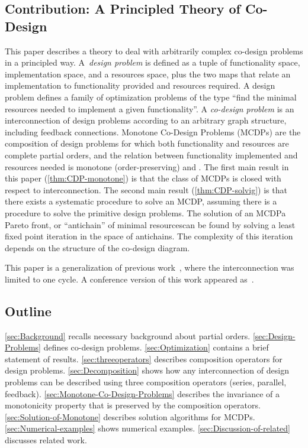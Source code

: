 \subsection{Contribution: A Principled Theory of Co-Design}

This paper describes a theory to deal with arbitrarily complex co-design
problems in a principled way. A~\emph{design problem} is defined
as a tuple of functionality space, implementation space, and a resources
space, plus the two maps that relate an implementation to functionality
provided and resources required. A design problem defines a family
of optimization problems of the type ``find the minimal resources
needed to implement a given functionality''. A \emph{co-design problem}
is an interconnection of design problems according to an arbitrary
graph structure, including feedback connections. Monotone Co-Design
Problems (MCDPs) are the composition of design problems for which
both functionality and resources are complete partial orders, and
the relation between functionality implemented and resources needed
is monotone (order-preserving) and \scottcontinuous. The first main
result in this paper (\cref{thm:CDP-monotone}) is that the
class of MCDPs is closed with respect to interconnection. The second
main result (\cref{thm:CDP-solvig}) is that there exists
a systematic procedure to solve an MCDP, assuming there is a procedure
to solve the primitive design problems. The solution of an MCDP\textemdash a
Pareto front, or ``antichain'' of minimal resources\textemdash can
be found by solving a least fixed point iteration in the space of
antichains. The complexity of this iteration depends on the structure
of the co-design diagram.

This paper is a generalization of previous work~\cite{censi15monotone},
where the interconnection was limited to one cycle. A conference
version of this work appeared as~\cite{censi15same}.



\subsection{Outline}

\cref{sec:Background} recalls necessary background about partial orders.
\cref{sec:Design-Problems} defines co-design problems. \cref{sec:Optimization}
contains a brief statement of results. \cref{sec:threeoperators} describes
composition operators for design problems. \cref{sec:Decomposition}
shows how any interconnection of design problems can be described
using three composition operators (series, parallel, feedback). \cref{sec:Monotone-Co-Design-Problems}
describes the invariance of a monotonicity property that is preserved
by the composition operators. \cref{sec:Solution-of-Monotone} describes
solution algorithms for MCDPs. \cref{sec:Numerical-examples} shows
numerical examples. \cref{sec:Discussion-of-related} discusses related
work.



